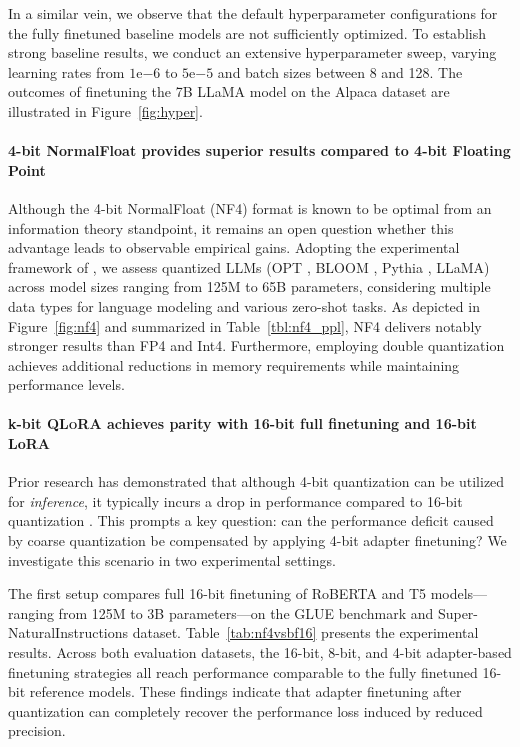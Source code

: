 In a similar vein, we observe that the default hyperparameter configurations for the fully finetuned baseline models are not sufficiently optimized. To establish strong baseline results, we conduct an extensive hyperparameter sweep, varying learning rates from $1\mathrm{e}{-6}$ to $5\mathrm{e}{-5}$ and batch sizes between 8 and 128. The outcomes of finetuning the 7B LLaMA model on the Alpaca dataset are illustrated in Figure~\ref{fig:hyper}.

\paragraph{4-bit NormalFloat provides superior results compared to 4-bit Floating Point} 

Although the 4-bit NormalFloat (NF4) format is known to be optimal from an information theory standpoint, it remains an open question whether this advantage leads to observable empirical gains. Adopting the experimental framework of \citet{dettmers2022case}, we assess quantized LLMs (OPT \citep{zhang2022opt}, BLOOM \cite{scao2022bloom}, Pythia \cite{biderman2023pythia}, LLaMA) across model sizes ranging from 125M to 65B parameters, considering multiple data types for language modeling and various zero-shot tasks. As depicted in Figure~\ref{fig:nf4} and summarized in Table~\ref{tbl:nf4_ppl}, NF4 delivers notably stronger results than FP4 and Int4. Furthermore, employing double quantization achieves additional reductions in memory requirements while maintaining performance levels.

\paragraph{k-bit \textsc{QLoRA} achieves parity with 16-bit full finetuning and 16-bit LoRA} Prior research has demonstrated that although 4-bit quantization can be utilized for \emph{inference}, it typically incurs a drop in performance compared to 16-bit quantization \citep{dettmers2022case,frantar2022gptq}. This prompts a key question: can the performance deficit caused by coarse quantization be compensated by applying 4-bit adapter finetuning? We investigate this scenario in two experimental settings.

The first setup compares full 16-bit finetuning of RoBERTA and T5 models—ranging from 125M to 3B parameters—on the GLUE benchmark and Super-NaturalInstructions dataset. Table~\ref{tab:nf4vsbf16} presents the experimental results. Across both evaluation datasets, the 16-bit, 8-bit, and 4-bit adapter-based finetuning strategies all reach performance comparable to the fully finetuned 16-bit reference models. These findings indicate that adapter finetuning after quantization can completely recover the performance loss induced by reduced precision.

